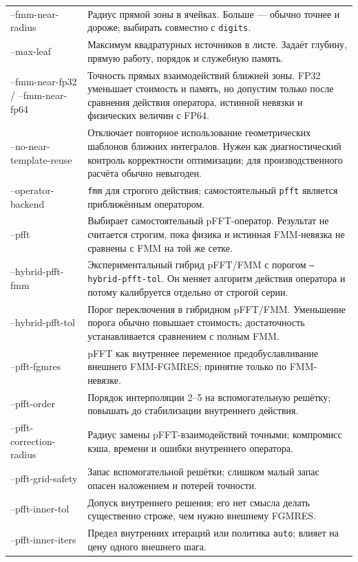\documentclass[12pt,a4paper]{article}
\begin{document}
\begin{longtable}{>{\ttfamily\raggedright\arraybackslash}p{}p{}}
--fmm-near-radius & Радиус прямой зоны в ячейках. Больше --- обычно точнее и дороже; выбирать совместно с \texttt{digits}.\\
--max-leaf & Максимум квадратурных источников в листе. Задаёт глубину, прямую работу, порядок и служебную память.\\
--fmm-near-fp32 / --fmm-near-fp64 & Точность прямых взаимодействий ближней зоны. FP32 уменьшает стоимость и память, но допустим только после сравнения действия оператора, истинной невязки и физических величин с FP64.\\
--no-near-\allowbreak template-\allowbreak reuse & Отключает повторное использование геометрических шаблонов ближних интегралов. Нужен как диагностический контроль корректности оптимизации; для производственного расчёта обычно невыгоден.\\
--operator-backend & \texttt{fmm} для строгого действия; самостоятельный \texttt{pfft} является приближённым оператором.\\
--pfft & Выбирает самостоятельный pFFT-оператор. Результат не считается строгим, пока физика и истинная FMM-невязка не сравнены с FMM на той же сетке.\\
--hybrid-pfft-fmm & Экспериментальный гибрид pFFT/FMM с порогом \texttt{--hybrid-pfft-tol}. Он меняет алгоритм действия оператора и потому калибруется отдельно от строгой серии.\\
--hybrid-pfft-tol & Порог переключения в гибридном pFFT/FMM. Уменьшение порога обычно повышает стоимость; достаточность устанавливается сравнением с полным FMM.\\
--pfft-fgmres & pFFT как внутреннее переменное предобуславливание внешнего FMM-FGMRES; принятие только по FMM-невязке.\\
--pfft-order & Порядок интерполяции 2--5 на вспомогательную решётку; повышать до стабилизации внутреннего действия.\\
--pfft-\allowbreak correction-\allowbreak radius & Радиус замены pFFT-взаимодействий точными; компромисс кэша, времени и ошибки внутреннего оператора.\\
--pfft-grid-safety & Запас вспомогательной решётки; слишком малый запас опасен наложением и потерей точности.\\
--pfft-inner-tol & Допуск внутреннего решения; его нет смысла делать существенно строже, чем нужно внешнему FGMRES.\\
--pfft-inner-iters & Предел внутренних итераций или политика \texttt{auto}; влияет на цену одного внешнего шага.\\

\end{longtable}
\end{document}
